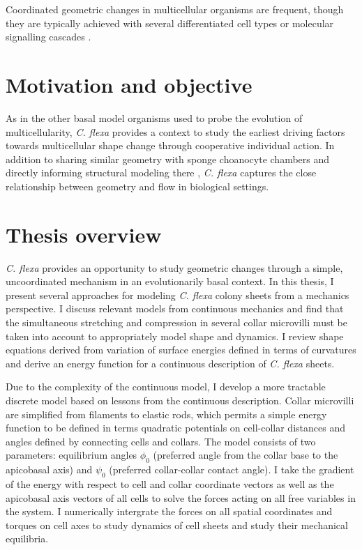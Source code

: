 Coordinated geometric changes in multicellular organisms are frequent, though they are typically achieved with several differentiated cell types or molecular signalling cascades \citep{todo}. 

\section{Motivation and objective}

As in the other basal model organisms used to probe the evolution of multicellularity, \textit{C. flexa} provides a context to study the earliest driving factors towards multicellular shape change through cooperative individual action. 
In addition to sharing similar geometry with sponge choanocyte chambers and directly informing structural modeling there \citep{asadzadeh2019}, \textit{C. flexa} captures the close relationship between geometry and flow in biological settings. 


\section{Thesis overview}

\textit{C. flexa} provides an opportunity to study geometric changes through a simple, uncoordinated mechanism in an evolutionarily basal context. 
In this thesis, I present several approaches for modeling \textit{C. flexa} colony sheets from a mechanics perspective. 
I discuss relevant models from continuous mechanics and find that the simultaneous stretching and compression in several collar microvilli must be taken into account to appropriately model shape and dynamics. 
I review shape equations derived from variation of surface energies defined in terms of curvatures and derive an energy function for a continuous description of \textit{C. flexa} sheets. 

Due to the complexity of the continuous model, I develop a more tractable discrete model based on lessons from the continuous description. 
Collar microvilli are simplified from filaments to elastic rods, which permits a simple energy function to be defined in terms quadratic potentials on cell-collar distances and angles defined by connecting cells and collars.
The model consists of two parameters: equilibrium angles $\phi_0$ (preferred angle from the collar base to the apicobasal axis) and $\psi_0$ (preferred collar-collar contact angle). 
I take the gradient of the energy with respect to cell and collar coordinate vectors as well as the apicobasal axis vectors of all cells to solve the forces acting on all free variables in the system.
I numerically intergrate the forces on all spatial coordinates and torques on cell axes to study dynamics of cell sheets and study their mechanical equilibria.

